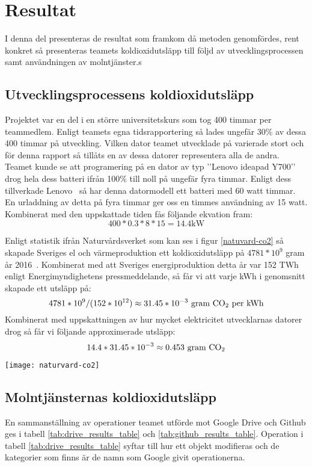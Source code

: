 \section{Resultat}
\label{sec:joel_a-results}
I denna del presenteras de resultat som framkom då metoden genomfördes, rent konkret så presenteras teamets koldioxidutsläpp till följd av utvecklingsprocessen samt användningen av molntjänster.s

\subsection{Utvecklingsprocessens koldioxidutsläpp}
Projektet var en del i en större universitetskurs som tog 400 timmar per teammedlem. Enligt teamets egna tidsrapportering så lades ungefär 30\% av dessa 400 timmar på utveckling. Vilken dator teamet utvecklade på varierade stort och för denna rapport så tillåts en av dessa datorer representera alla de andra. Teamet kunde se att programering på en dator av typ ’’Lenovo ideapad Y700’’ drog hela dess batteri ifrån 100\% till noll på ungefär fyra timmar. Enligt dess tillverkade Lenovo~\cite{lenovo} så har denna datormodell ett batteri med 60 watt timmar. En urladdning av detta på fyra timmar ger oss en timmes användning av 15 watt. Kombinerat med den uppskattade tiden fås följande ekvation fram: $$ 400 * 0.3 * 8* 15 = 14.4 \text{kW}$$

Enligt statistik ifrån Naturvårdsverket som kan ses i figur \ref{natuvard-co2} så skapade Sveriges el och värmeproduktion ett koldioxidutsläpp på $4781*10^9$ gram år 2016~\cite{naturvardsverket}. Kombinerat med att Sveriges energiproduktion detta år var 152 TWh enligt Energimyndighetens pressmeddelande\cite{elprod2016}, så får vi att varje kWh i genomsnitt skapade ett utsläpp på: $$4781*10^9 / (152 * 10^{12}) \approx 31.45 * 10^{-3} \text{ gram \ce{CO2} per kWh}$$ 
Kombinerat med uppskattningen av hur mycket elektricitet utvecklarnas datorer drog så får vi följande approximerade utsläpp: $$14.4 * 31.45 * 10^{-3} \approx 0.453 \text{ gram \ce{CO2}}$$

\begin{figure*}[!htbp]
	\texttt{[image: naturvard-co2]}
	\caption[Statistik ifrån naturvårdsverket gällande utsläpp av växthusgaser]{Statistik ifrån naturvårdsverket~\cite{naturvardsverket}}
	\label{natuvard-co2}
\end{figure*}



\subsection{Molntjänsternas koldioxidutsläpp}
En sammanställning av operationer teamet utförde mot Google Drive och Github ges i tabell \ref{tab:drive_results_table} och \ref{tab:github_results_table}. Operation i tabell \ref{tab:drive_results_table} syftar till hur ett objekt modifieras och de kategorier som finns är de namn som Google givit operationerna.


